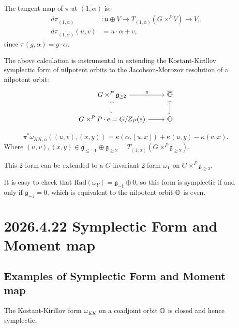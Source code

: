 \documentclass[12pt]{amsart}
\numberwithin{equation}{section}
\newcommand{\fg}{\mathfrak{g}} \newcommand{\fh}{\mathfrak{h}} \newcommand{\fk}{\mathfrak{k}}
\newcommand{\fu}{\mathfrak{u}} \newcommand{\fv}{\mathfrak{v}} \newcommand{\fy}{\mathfrak{y}}
\renewcommand{\bar}{\overline}
\begin{document}
The tangent map of $\pi$ at $\bar{(1,\alpha)}$ is:
\begin{align*}
  d \pi_{\bar{(1,\alpha)}} &: \fu \oplus V \to T_{\bar{(1,\alpha)}}(G \times^P V) \to V, \\
  d\pi_{\bar{(1,\alpha)}}(u,v) &= u \cdot \alpha + v,
\end{align*}
since $\pi(g,\alpha) = g \cdot \alpha$.

The above calculation is instrumental in extending the Kostant-Kirillov symplectic form of nilpotent orbits to the Jacobson-Morozov resolution of a nilpotent orbit:
\[
\begin{tikzcd}
  G \times^P \fg_{\geq 2} \arrow[r, "\pi"] & \bar{\BO} \\
  G \times^{P}  P \cdot e = G/Z_P(e) \arrow[r] \arrow[u,hookrightarrow ] & \BO \arrow[u,hookrightarrow ] 
\end{tikzcd}
\]

\[
  \pi^* \omega_{KK,\alpha}((u,v),(x,y)) = \kappa(\alpha, [u,x]) + \kappa(u,y) - \kappa(v,x).
\]
Where $(u,v), (x,y) \in \fg_{\leq -1} \oplus \fg_{\geq 2} = T_{\bar{(1,\alpha)}}(G \times^P \fg_{\geq 2})$.

This 2-form can be extended to a $G$-invariant 2-form $\omega_Y$ on $G \times^P \fg_{\geq 2}$. 

It is easy to check that $\mathrm{Rad}(\omega_{Y}) = \fg_{-1} \oplus 0$, so this form is symplectic if and only if $\fg_{-1} = 0$, which is equivalent to the nilpotent orbit ${\mathbb {O}}$ is even.

\section{2026.4.22 Symplectic Form and Moment map}

\cite{Losev2022Topics}
\subsection{Examples of Symplectic Form and Moment map}

\begin{prop}
  The Kostant-Kirillov form $\omega_{KK}$ on a coadjoint orbit ${\mathbb {O}}$ is closed and hence symplectic.
\end{prop}
\end{document}
